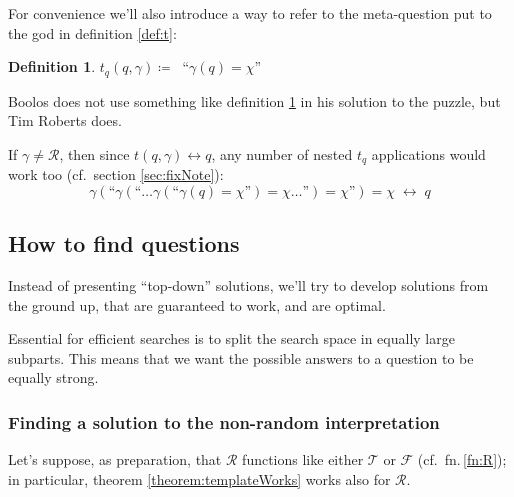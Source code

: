 \documentclass[twoside,twocolumn,a4paper,11pt]{article}
\theoremstyle{definition}
\newtheorem{defn}[theorem]{Definition}
\begin{document}
For convenience we'll also introduce a way to refer to the meta-question put to the god 
in definition \ref{def:t}:
\begin{defn}
\label{def:tq}
\(
t_q(q,\gamma)\coloneqq\;\;
 \mbox{``}\gamma(q)=\chi\mbox{''} 
\)
\end{defn}

Boolos does not use something like definition \ref{def:tq} in his solution to the 
puzzle,\cite{bool96}
but Tim Roberts does.\cite{rob01}

If $\gamma\neq\mathcal{R}$, then since $t(q,\gamma)\leftrightarrow q$, 
any number of nested $t_q$ applications would work too
(cf.\ section \ref{sec:fixNote}):
\[
 \gamma( \mbox{``}\gamma(\mbox{``}\ldots \gamma( \mbox{``}\gamma(q)=\chi\mbox{''}) =
  \chi\ldots\mbox{''}) = \chi\mbox{''}) = \chi 
 \;\leftrightarrow\;  q
\]


\subsection{How to find questions}
Instead of presenting ``top-down'' solutions,
we'll try to develop solutions from the ground up,
that are guaranteed to work, and are optimal.

Essential for efficient searches is to split the search space in equally large subparts.
This means that we want the possible answers to a question to be equally strong.


\subsubsection{Finding a solution to the non-random interpretation}
Let's suppose, 
as preparation,
that $\mathcal{R}$ functions like either 
$\mathcal{T}$ or $\mathcal{F}$ (cf.\ fn.\,\ref{fn:R});
in particular, theorem \ref{theorem:templateWorks} works also for $\mathcal{R}$.

\end{document}
